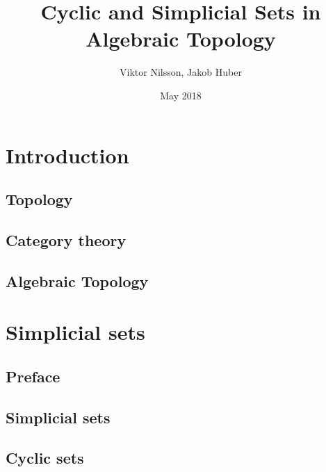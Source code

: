 \documentclass{report}
\title{Cyclic and Simplicial Sets in Algebraic Topology}
\author{Viktor Nilsson, Jakob Huber}
\date{May 2018}
\theoremstyle{definition}
\begin{document}
    \maketitle
    
    \begin{abstract}
        
    \end{abstract}
    
    \tableofcontents
    
    \chapter{Introduction}
        
        
        \section{Topology}
            
        \section{Category theory}
            
        \section{Algebraic Topology}
            
    
    \chapter{Simplicial sets}
        \section{Preface}
            
        \section{Simplicial sets}
            
        \section{Cyclic sets}
            
    
    \printbibliography
\end{document}

